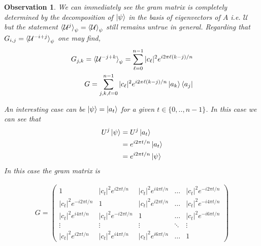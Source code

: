 \documentclass[12pt,letterpaper]{article}
\newtheorem{observation}{Observation}
\begin{document}
\begin{multicols}{2}
\begin{observation}
We can immediately see the gram matrix is completely determined by the decomposition of $\ket{\psi}$ in the basis of eigenvectors of $A$ i.e. $\mathcal{U}$ but the statement $\braket{\mathcal{U}^{j}}_{\psi} =\braket{\mathcal{U}}_{\psi}$ still remains untrue in general. Regarding that $G_{i,j} =  \braket{\mathcal{U}^{-i+j}}_\psi $ one may find,
\begin{align}
G_{j,k}=\braket{\mathcal{U}^{-j+k}}_\psi= \sum_{\ell=0}^{n-1}|c_\ell|^2e^{i2\pi \ell(k-j)/n}\\
G=\sum_{j,k,\ell=0}^{n-1}|c_\ell|^2e^{i2\pi \ell(k-j)/n}\ket{a_k}\bra{a_j}
\end{align}

\par 
An interesting case can be $\ket{\psi}=\ket{a_t}$ for a given $t\in\{0,..,n-1\}$. In this case we can see that 
\begin{align}
U^j\ket{\psi}&=U^j\ket{a_t}\\&=e^{i2\pi t/n}\ket{a_t}\\&=e^{i2\pi t/n}\ket{\psi}
\end{align}
In this case the gram matrix is
\end{observation}
\end{multicols}
\begin{align}\label{eqGramMatrixZn}
G=\begin{pmatrix}
 1 & |c_t|^2e^{i2\pi t/n} & |c_t|^2e^{i4\pi t/n} & \hdots &  |c_t|^2e^{-i2\pi t/n} \\
  |c_t|^2e^{-i2\pi t/n} & 1 & |c_t|^2e^{i2\pi t/n} & \hdots & |c_t|^2e^{-i4\pi t/n} \\
  |c_t|^2e^{i4\pi t/n} &  |c_t|^2e^{-i2\pi t/n}  & 1 & \hdots & |c_t|^2e^{-i6\pi t/n}  \\
   \vdots & \vdots & \vdots & \ddots & \vdots \\
  |c_t|^2e^{i2\pi t/n} &|c_t|^2e^{i4\pi t/n}  & |c_t|^2e^{i6\pi t/n}  & \hdots &  1 
\end{pmatrix}
\end{align}
\end{document}
